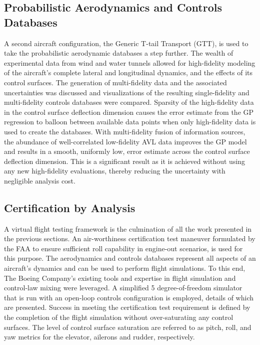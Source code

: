\subsection{Probabilistic Aerodynamics and Controls Databases}
A second aircraft configuration, the Generic T-tail Transport (GTT), is used to take the probabilistic aerodynamic databases a step further.
The wealth of experimental data from wind and water tunnels allowed for high-fidelity modeling of the aircraft's complete lateral and longitudinal dynamics, and the effects of its control surfaces.
The generation of multi-fidelity data and the associated uncertainties was discussed and visualizations of the resulting single-fidelity and multi-fidelity controls databases were compared.
Sparsity of the high-fidelity data in the control surface deflection dimension causes the error estimate from the GP regression to balloon between available data points when only high-fidelity data is used to create the databases.
With multi-fidelity fusion of information sources, the abundance of well-correlated low-fidelity AVL data improves the GP model and results in a smooth, uniformly low, error estimate across the control surface deflection dimension. 
This is a significant result as it is achieved without using any new high-fidelity evaluations, thereby reducing the uncertainty with negligible analysis cost. 

\subsection{Certification by Analysis}
A virtual flight testing framework is the culmination of all the work presented in the previous sections. 
An air-worthiness certification test maneuver formulated by the FAA \cite{romanowski_flight_2018} to ensure sufficient roll capability in engine-out scenarios, is used for this purpose.
The aerodynamics and controls databases represent all aspects of an aircraft's dynamics and can be used to perform flight simulations.
To this end, The Boeing Company's existing tools and expertise in flight simulation and control-law mixing \cite{control_law_patent} were leveraged.
A simplified 5 degree-of-freedom simulator that is run with an open-loop controls configuration is employed, details of which are presented. 
Success in meeting the certification test requirement is defined by the completion of the flight simulation without over-saturating any control surfaces.
The level of control surface saturation are referred to as pitch, roll, and yaw metrics for the elevator, ailerons and rudder, respectively. 

